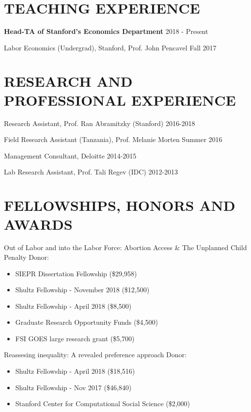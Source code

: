 \documentclass[margin]{res} %
\begin{document}
\begin{resume}
\section{TEACHING EXPERIENCE}

 \textbf{Head-TA of Stanford's Economics Department} \hfill 2018 - Present

 Labor Economics (Undergrad), Stanford, Prof. John Pencavel \hfill Fall 2017

 
\section{RESEARCH AND PROFESSIONAL EXPERIENCE}
 Research Assistant, Prof. Ran Abramitzky (Stanford) \hfill 2016-2018

 Field Research Assistant (Tanzania), Prof. Melanie Morten \hfill Summer 2016
 
 Management Consultant, Deloitte \hfill 2014-2015 

 Lab Research Assistant, Prof. Tali Regev (IDC) \hfill 2012-2013


\section{FELLOWSHIPS, HONORS AND AWARDS}

Out of Labor and into the Labor Force: Abortion Access \& The Unplanned Child Penalty
Donor: 
\begin{itemize}
	\item SIEPR Dissertation Fellowship (\$29,958)
	\item Shultz Fellowship - November 2018 (\$12,500)
    \item Shultz Fellowship - April 2018 (\$8,500)
    \item Graduate Research Opportunity Funds (\$4,500)
    \item FSI GOES large research grant (\$5,700)
\end{itemize}	

Reassesing inequality: A revealed preference approach
Donor: 
\begin{itemize}
	\item Shultz Fellowship - April 2018 (\$18,516)
	\item Shultz Fellowship - Nov 2017 (\$46,840)
	\item Stanford Center for Computational Social Science (\$2,000) 
\end{itemize}	


\end{resume}
\end{document}
